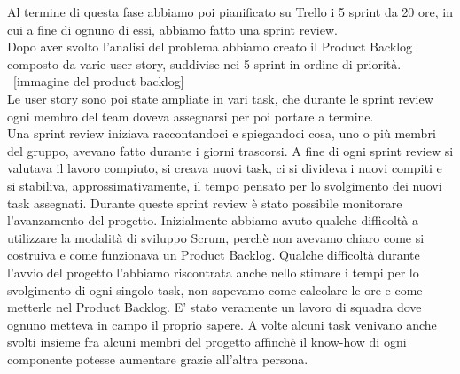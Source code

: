 \documentclass[10pt, english]{article}
\begin{document}
Al termine di questa fase abbiamo poi pianificato su Trello i 5 sprint da 20 ore, in cui a fine di ognuno di essi, abbiamo fatto una sprint review.\\Dopo aver svolto l'analisi del problema abbiamo creato il Product Backlog composto da varie user story, suddivise nei 5 sprint in ordine di priorità. \\

{\ [immagine del product backlog]}\\

Le user story sono poi state ampliate in vari task, che durante le sprint review ogni membro del team doveva assegnarsi per poi portare a termine. \\Una sprint review iniziava raccontandoci e spiegandoci cosa, uno o più membri del gruppo, avevano fatto durante i giorni trascorsi. A fine di ogni sprint review si valutava il lavoro compiuto, si creava nuovi task, ci si divideva i nuovi compiti e si stabiliva, approssimativamente, il tempo pensato per lo svolgimento dei nuovi task assegnati. Durante queste sprint review è stato possibile monitorare l'avanzamento del progetto. Inizialmente abbiamo avuto qualche difficoltà a utilizzare la modalità di sviluppo Scrum, perchè non avevamo chiaro come si costruiva e come funzionava un Product Backlog. Qualche difficoltà durante l'avvio del progetto l'abbiamo riscontrata anche nello stimare i tempi per lo svolgimento di ogni singolo task, non sapevamo come calcolare le ore e come metterle nel Product Backlog. E' stato veramente un lavoro di squadra dove ognuno metteva in campo il proprio sapere. A volte alcuni task venivano anche svolti insieme fra alcuni membri del progetto affinchè il know-how di ogni componente potesse aumentare grazie all'altra persona.



\end{document}
